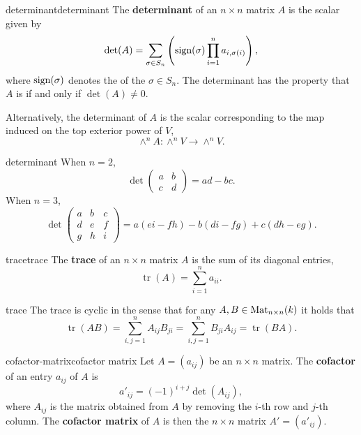 \begin{topic}{determinant}{determinant}
    The \textbf{determinant} of an $n \times n$ matrix $A$ is the scalar given by
    \[ \det(A) = \sum_{\sigma \in S_n} \left( \textup{sign}(\sigma) \prod_{i = 1}^{n} a_{i, \sigma(i)} \right) , \]
    where $\textup{sign}(\sigma)$ denotes the  of the  $\sigma \in S_n$. The determinant has the property that $A$ is  if and only if $\det(A) \ne 0$.
    
    Alternatively, the determinant of $A$ is the scalar corresponding to the map induced on the top exterior power of $V$,
    \[ \wedge^n A \colon \wedge^n V \to \wedge^n V . \]
\end{topic}

\begin{example}{determinant}
    When $n = 2$,
    \[ \det \begin{pmatrix} a & b \\ c & d \end{pmatrix} = ad - bc . \]
    When $n = 3$,
    \[ \det \begin{pmatrix} a & b & c \\ d & e & f \\ g & h & i \end{pmatrix} = a(ei - fh) - b(di - fg) + c(dh - eg) . \]
\end{example}

\begin{topic}{trace}{trace}
    The \textbf{trace} of an $n \times n$ matrix $A$ is the sum of its diagonal entries,
    \[ \operatorname{tr}(A) = \sum_{i = 1}^{n} a_{ii} . \]
\end{topic}

\begin{example}{trace}
    The trace is cyclic in the sense that for any $A, B \in \textup{Mat}_{n \times n}(k)$ it holds that
    \[ \operatorname{tr}(AB) = \sum_{i, j = 1}^{n} A_{ij} B_{ji} = \sum_{i, j = 1}^{n} B_{ji} A_{ij} = \operatorname{tr}(BA) . \]
\end{example}

\begin{topic}{cofactor-matrix}{cofactor matrix}
    Let $A = (a_{ij})$ be an $n \times n$ matrix. The \textbf{cofactor} of an entry $a_{ij}$ of $A$ is
    \[ a'_{ij} = (-1)^{i + j} \det(A_{ij}), \]
    where $A_{ij}$ is the matrix obtained from $A$ by removing the $i$-th row and $j$-th column. The \textbf{cofactor matrix} of $A$ is then the $n \times n$ matrix $A' = (a'_{ij})$.
\end{topic}

